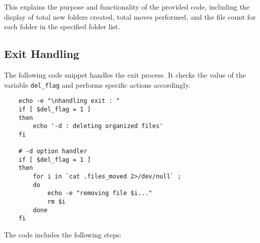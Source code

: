 \documentclass[12pt]{article}
\begin{document}
    This explains the purpose and functionality of the provided code, including the display of total new folders created, total moves performed, and the file count for each folder in the specified folder list.



    \subsection{Exit Handling}
    
    The following code snippet handles the exit process. It checks the value of the variable \texttt{del\_flag} and performs specific actions accordingly.
    
    \begin{verbatim}
    echo -e "\nhandling exit : "
    if [ $del_flag = 1 ]
    then
        echo '-d : deleting organized files'
    fi
    
    # -d option handler
    if [ $del_flag = 1 ]
    then
        for i in `cat .files_moved 2>/dev/null` ;
        do
            echo -e "removing file $i..."
            rm $i
        done
    fi
    \end{verbatim}
    
    The code includes the following steps:
    
\end{document}
